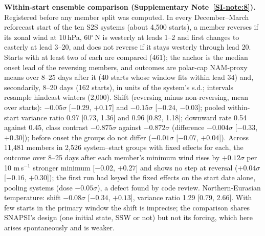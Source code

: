 \documentclass[11pt]{article}
\begin{document}
\textbf{Within-start ensemble comparison (Supplementary Note~\ref{SI-note:8}).} Registered before any member split was computed. In every December–March reforecast start of the ten S2S systems (about 4,500 starts), a member reverses if its zonal wind at 10\,hPa, 60$^\circ$\,N is westerly at leads 1–2 and first changes to easterly at lead 3–20, and does not reverse if it stays westerly through lead 20. Starts with at least two of each are compared (461); the anchor is the median onset lead of the reversing members, and outcomes are polar-cap NAM-proxy means over 8–25 days after it (40 starts whose window fits within lead 34) and, secondarily, 8–20 days (162 starts), in units of the system's s.d.; intervals resample hindcast winters (2,000). Shift (reversing minus non-reversing, mean over starts): $-0.05\sigma$ [$-0.29$, $+0.17$] and $-0.15\sigma$ [$-0.24$, $-0.03$]; pooled within-start variance ratio 0.97 [0.73, 1.36] and 0.96 [0.82, 1.18]; downward rate 0.54 against 0.45, class contrast $-0.875\sigma$ against $-0.872\sigma$ (difference $-0.004\sigma$ [$-0.33$, $+0.30$]); before onset the groups do not differ ($-0.01\sigma$ [$-0.07$, $+0.04$]). Across 11,481 members in 2,526 system–start groups with fixed effects for each, the outcome over 8–25 days after each member's minimum wind rises by $+0.12\sigma$ per 10 m\,s$^{-1}$ stronger minimum [$-0.02$, $+0.27$] and shows no step at reversal ($+0.04\sigma$ [$-0.16$, $+0.30$]); the first run had keyed the fixed effects on the start date alone, pooling systems (dose $-0.05\sigma$), a defect found by code review. Northern-Eurasian temperature: shift $-0.08\sigma$ [$-0.34$, $+0.13$], variance ratio 1.29 [0.79, 2.66]. With few starts in the primary window the shift is imprecise; the comparison shares SNAPSI's design (one initial state, SSW or not) but not its forcing, which here arises spontaneously and is weaker.
\end{document}
